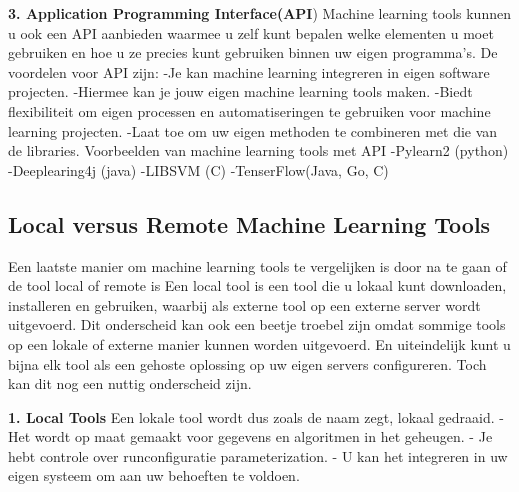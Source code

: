 \textbf{3. Application Programming Interface(API})\newline
Machine learning tools kunnen u ook een API aanbieden waarmee u zelf kunt bepalen welke elementen u moet gebruiken en hoe u ze precies kunt gebruiken binnen uw eigen programma’s. De voordelen voor API zijn:\newline
-Je kan machine learning integreren in eigen software projecten.\newline
-Hiermee kan je jouw eigen machine learning tools maken.\newline
-Biedt flexibiliteit om eigen processen en automatiseringen te gebruiken voor machine learning projecten.\newline
-Laat toe om uw eigen methoden te combineren met die van de libraries.\newline
Voorbeelden van machine learning tools met API\newline
-Pylearn2 (python)\newline
-Deeplearing4j (java)\newline
-LIBSVM (C)\newline
-TenserFlow(Java, Go, C)\newline

\subsection{Local versus Remote Machine Learning Tools}
Een laatste manier om machine learning tools te vergelijken is door na te gaan of de tool local of remote is
Een local tool is een tool die u lokaal kunt downloaden, installeren en gebruiken, waarbij als externe tool op een externe server wordt uitgevoerd. Dit onderscheid kan ook een beetje troebel zijn omdat sommige tools op een lokale of externe manier kunnen worden uitgevoerd. En uiteindelijk kunt u bijna elk tool als een gehoste oplossing op uw eigen servers configureren. Toch kan dit nog een nuttig onderscheid zijn.

\textbf{1. Local Tools} \newline
Een lokale tool wordt dus zoals de naam zegt, lokaal gedraaid. \newline
- Het wordt op maat gemaakt voor gegevens en algoritmen in het geheugen. \newline
- Je hebt controle over runconfiguratie parameterization. \newline
- U kan het integreren in uw eigen systeem om aan uw behoeften te voldoen. \newline

